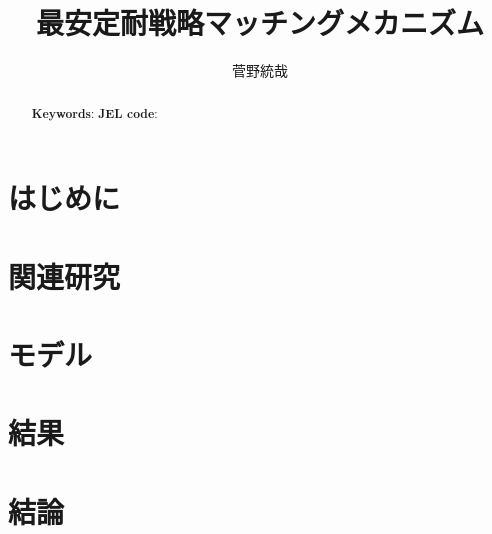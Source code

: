 \documentclass[12pt, uplatex, dvipdfmx]{jsarticle}
\begin{document}
\title{最安定耐戦略マッチングメカニズム}
\author{菅野統哉}
\maketitle

\begin{abstract}
\noindent
\textbf{Keywords}:
\textbf{JEL code}:
\end{abstract}

\section{はじめに}
\section{関連研究}
\section{モデル}
\section{結果}
\section{結論}
\end{document}
